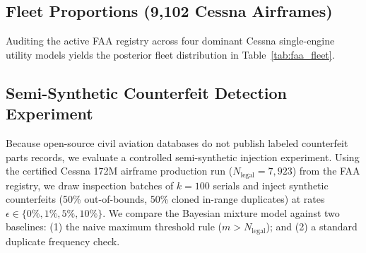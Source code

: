\documentclass[11pt,a4paper]{article}
\begin{document}
\subsection{Fleet Proportions (9,102 Cessna Airframes)}
Auditing the active FAA registry across four dominant Cessna single-engine utility models yields the posterior fleet distribution in Table~\ref{tab:faa_fleet}.

\begin{table}[H]
\centering
\caption{Posterior fleet share distributions for Cessna aircraft on the FAA registry.}
\label{tab:faa_fleet}
\end{table}

\subsection{Semi-Synthetic Counterfeit Detection Experiment}
Because open-source civil aviation databases do not publish labeled counterfeit parts records, we evaluate a controlled semi-synthetic injection experiment. Using the certified Cessna 172M airframe production run ($N_{\text{legal}} = 7,923$) from the FAA registry, we draw inspection batches of $k = 100$ serials and inject synthetic counterfeits (50\% out-of-bounds, 50\% cloned in-range duplicates) at rates $\epsilon \in \{0\%, 1\%, 5\%, 10\%\}$. We compare the Bayesian mixture model against two baselines: (1) the naive maximum threshold rule ($m > N_{\text{legal}}$); and (2) a standard duplicate frequency check.
\end{document}

